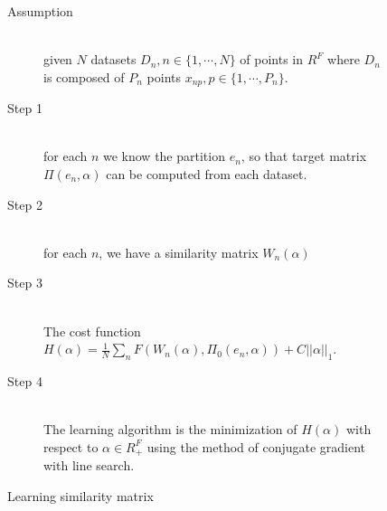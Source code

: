 \begin{figure}[ht]
\begin{mdframed}
\begin{description}
\item[Assumption] \hfill \\
given $N$ datasets $D_n, n \in \{ 1, \cdots, N \}$ of points in $R^F$ where $D_n$ is composed of $P_n$ points $x_{np}, p \in \{ 1, \cdots, P_n \}$.
\item[Step 1] \hfill \\
for each $n$ we know the partition $e_n$, so that target matrix $ \Pi (e_n, \alpha)$ can be computed from each dataset.
\item[Step 2] \hfill \\
for each $n$, we have a similarity matrix $W_n (\alpha)$
\item[Step 3] \hfill \\
The cost function $H(\alpha) = \frac{1}{N} \sum_n F( W_n(\alpha), \Pi_0 (e_n, \alpha)) + C || \alpha ||_1$.
\item[Step 4] \hfill \\
The learning algorithm is the minimization of $H(\alpha)$ with respect to $\alpha \in R_{+}^F$ using the method of conjugate gradient with line search.
\end{description}
\end{mdframed}
\caption{Learning similarity matrix}
\end{figure}

